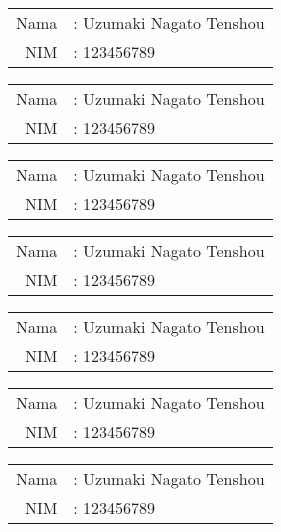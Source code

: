 \documentclass[11pt,a4paper]{article}
\theoremstyle{plain}
\theoremstyle{definition}
\theoremstyle{remark}
\begin{document}
\newpage
 
\begin{flushright}
	\begin{tabular}{rl}
		Nama &: Uzumaki Nagato Tenshou\\
		NIM  &: 123456789 
	\end{tabular}
\end{flushright}


\newpage
 
\begin{flushright}
	\begin{tabular}{rl}
		Nama &: Uzumaki Nagato Tenshou\\
		NIM  &: 123456789 
	\end{tabular}
\end{flushright}

\newpage
 
\begin{flushright}
	\begin{tabular}{rl}
		Nama &: Uzumaki Nagato Tenshou\\
		NIM  &: 123456789 
	\end{tabular}
\end{flushright}

\newpage
 
\begin{flushright}
	\begin{tabular}{rl}
		Nama &: Uzumaki Nagato Tenshou\\
		NIM  &: 123456789 
	\end{tabular}
\end{flushright}

\newpage
 
\begin{flushright}
	\begin{tabular}{rl}
		Nama &: Uzumaki Nagato Tenshou\\
		NIM  &: 123456789 
	\end{tabular}
\end{flushright}


\newpage
 
\begin{flushright}
	\begin{tabular}{rl}
		Nama &: Uzumaki Nagato Tenshou\\
		NIM  &: 123456789 
	\end{tabular}
\end{flushright}


\newpage
 
\begin{flushright}
	\begin{tabular}{rl}
		Nama &: Uzumaki Nagato Tenshou\\
		NIM  &: 123456789 
	\end{tabular}
\end{flushright}
\end{document}
